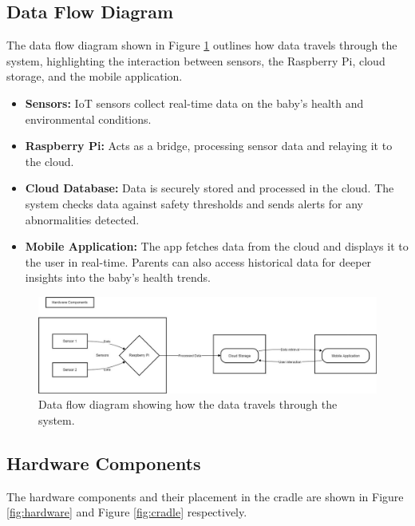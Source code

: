 \documentclass[12pt,a4paper]{report}
\begin{document}
\subsection{Data Flow Diagram}
The data flow diagram shown in Figure \ref{fig:dataflow} outlines how data travels through the system, highlighting the interaction between sensors, the Raspberry Pi, cloud storage, and the mobile application.

\begin{itemize}
  \item \textbf{Sensors:} IoT sensors collect real-time data on the baby’s health and environmental conditions.
  \item \textbf{Raspberry Pi:} Acts as a bridge, processing sensor data and relaying it to the cloud.
  \item \textbf{Cloud Database:} Data is securely stored and processed in the cloud. The system checks data against safety thresholds and sends alerts for any abnormalities detected.
  \item \textbf{Mobile Application:} The app fetches data from the cloud and displays it to the user in real-time. Parents can also access historical data for deeper insights into the baby’s health trends.
\end{itemize}

\begin{figure}[hbtp]
  \centering
  \includegraphics[scale=0.35]{./pic/WhatsApp Image 2024-10-23 at 22.00.55_66baa9c8.jpg}
  \caption{Data flow diagram showing how the data travels through the system.}
  \label{fig:dataflow}
\end{figure}
\subsection{Hardware Components}
The hardware components and their placement in the cradle are shown in Figure \ref{fig:hardware} and Figure \ref{fig:cradle} respectively.
\end{document}
